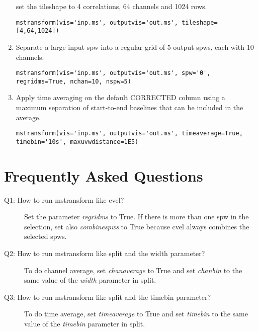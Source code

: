 \begin{enumerate}
set the tileshape to 4 correlations, 64 channels and 1024 rows.
\begin{verbatim}
mstransform(vis='inp.ms', outputvis='out.ms', tileshape=[4,64,1024])
\end{verbatim}
\item Separate a large input spw into a regular grid of 5 output spws, each with 10 channels.
\begin{verbatim}
mstransform(vis='inp.ms', outputvis='out.ms', spw='0', regridms=True, nchan=10, nspw=5)
\end{verbatim}
\item Apply time averaging on the default CORRECTED column using a maximum separation of start-to-end 
baselines that can be included in the average.
\begin{verbatim}
mstransform(vis='inp.ms', outputvis='out.ms', timeaverage=True, timebin='10s', maxuvwdistance=1E5)
\end{verbatim}


\end{enumerate}

\section{Frequently Asked Questions}\label{Sec:FAQ}
\begin{description}
  \item[Q1: How to run mstransform like cvel?] \hfill 
  Set the parameter {\it regridms} to True. If there is more than one spw in the
selection, set also {\it combinespws} to True because cvel always combines the selected
spws.

  \item[Q2: How to run mstransform like split and the width parameter?] \hfill 
  To do channel average, set {\it chanaverage} to True and set {\it chanbin} to
  the same value of the {\it width} parameter in split.

  \item[Q3: How to run mstransform like split and the timebin parameter?] \hfill 
  To do time average, set {\it timeaverage} to True and set {\it timebin} to
  the same value of the {\it timebin} parameter in split.
\item[]
\end{description}

